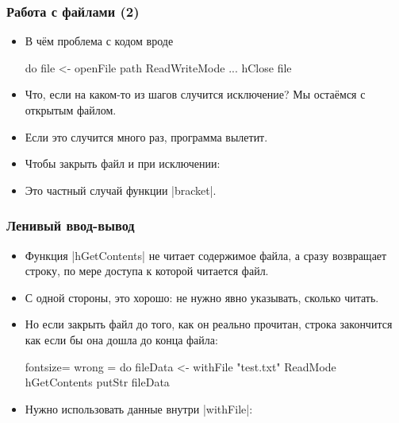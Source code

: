 \documentclass[11pt]{beamer}
\begin{document}
\begin{frame}[fragile]
\frametitle{Работа с файлами (2)}
\begin{itemize}
    \item В чём проблема с кодом вроде
    \begin{haskell}
    do
      file <- openFile path ReadWriteMode
      ...
      hClose file
    \end{haskell}
    \pause
    \item Что, если на каком-то из шагов случится исключение? Мы остаёмся с открытым файлом.
    \item Если это случится много раз, программа вылетит.
    \pause
    \item Чтобы закрыть файл и при исключении:
    \item Это частный случай функции \haskinline|bracket|.
\end{itemize}
\end{frame}

\begin{frame}[fragile]
\frametitle{Ленивый ввод-вывод}
\begin{itemize}
    \item Функция \haskinline|hGetContents| не читает содержимое файла, а сразу возвращает строку, по мере доступа к которой читается файл.
    \item С одной стороны, это хорошо: не нужно явно указывать, сколько читать.
    \item Но если закрыть файл до того, как он реально прочитан, строка закончится как если бы она дошла до конца файла:
    \begin{haskell*}{fontsize=\footnotesize}
    wrong = do
      fileData <- withFile "test.txt" ReadMode hGetContents
      putStr fileData
    \end{haskell*}
    \item Нужно использовать данные внутри \haskinline|withFile|:
\end{itemize}
\end{frame}
    
\end{document}

